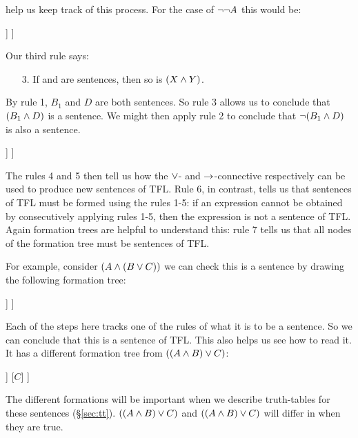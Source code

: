  help us keep track of this process. For the case of $\neg\neg A$ this would be:
\begin{center}
\begin{forest}
	[$\mainconnective{\enot}\enot A$
		[$\mainconnective{\enot}A$
			[$A$]
		]
	]
\end{forest}
\end{center}

Our third rule says:
\begin{enumerate}
\item[3.] If \metaX and \metaY are sentences, then so is $(X\mathbin{\wedge}Y)$.
\end{enumerate}
By rule 1, $B_1$ and $D$ are both sentences. So rule 3 allows us to conclude that $(B_1\mathbin{\wedge} D)$ is a sentence. We might then apply rule 2 to conclude that $\neg(B_1\mathbin{\wedge} D)$ is also a sentence.
\begin{center}
\begin{forest}
	[$\mainconnective{\enot} (B_1 \eand D)$
		[$(B_1\mainconnective{\eand} D)$
			[$B_1$]
			[$D$]
		]
	]
\end{forest}
\end{center}

The rules 4 and 5 then tell us how the $\vee$- and $\rightarrow$-connective respectively can be used to produce new sentences of TFL. Rule 6, in contrast, tells us that sentences of TFL must be formed using the rules 1-5: if an expression cannot be obtained by consecutively applying rules 1-5, then the expression is not a sentence of TFL. Again formation trees are helpful to understand this: rule 7 tells us that all nodes of the formation tree must be sentences of TFL.

For example, consider $(A \mathbin{\wedge} (B \vee C))$ we can check this is a sentence by drawing the following formation tree:
\label{S:formationtree}
\begin{center}
\begin{forest}
	[$(A\mainconnective{\eand} (B\eor C))$
		[$A$]
		[$(B\mainconnective{\eor} C)$
			[$B$]
			[$C$]
		]
	]
\end{forest}
\end{center}
Each of the steps here tracks one of the rules of what it is to be a sentence. So we can conclude that this is a sentence of TFL. This also helps us see how to read it.
It has a different formation tree from $((A\mathbin{\wedge} B)\vee C)$:
\begin{center}
\begin{forest}
	[$((A{\eand} B)\mainconnective{\eor} C))$
		[$(A\mainconnective{\eand} B)$
			[$A$]
			[$B$]
		]
		[$C$]
	]
\end{forest}
\end{center}
The different formations will be important when we describe truth-tables for these sentences (\S\ref{sec:tt}). $((A\mathbin{\wedge} B)\vee C)$ and $((A\mathbin{\wedge} B)\vee C)$ will differ in when they are true.


